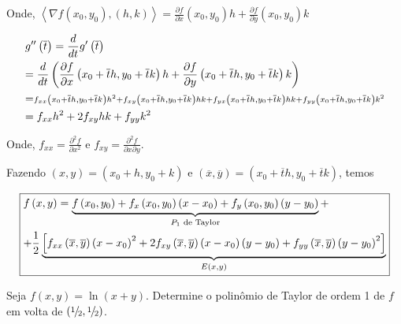 \documentclass[11pt, oneside, a4paper]{gsm-l}
\begin{document}
Onde, $\left\langle {\nabla f\left( {x_0 ,y_0 } \right),\left( {h,k} \right)} \right\rangle  = \frac{{\partial f}}
{{\partial x}}\left( {x_0 ,y_0 } \right)h + \frac{{\partial f}}
{{\partial y}}\left( {x_0 ,y_0 } \right)k$

\[
\begin{gathered}
g''\left( {\overline t } \right) = \frac{d}
{{dt}}g'\left( {\overline t } \right) \hfill \\
= \frac{d}
{{dt}}\left( {\frac{{\partial f}}
{{\partial x}}\left( {x_0  + \overline t h,y_0  + \overline t k} \right)h + \frac{{\partial f}}
{{\partial y}}\left( {x_0  + \overline t h,y_0  + \overline t k} \right)k} \right) \hfill \\
   = \scriptstyle{f_{xx} \left( {x_0  + \overline t h,y_0  + \overline t k} \right)h^2  + f_{xy} \left( {x_0  + \overline t h,y_0  + \overline t k} \right)hk + f_{yx} \left( {x_0  + \overline t h,y_0  + \overline t k} \right)hk + f_{yy} \left( {x_0  + \overline t h,y_0  + \overline t k} \right)k^2}  \hfill \\
= f_{xx} h^2  + 2f_{xy} hk + f_{yy} k^2  \hfill \\
\end{gathered}
\]

Onde, $f_{xx}  = \frac{{\partial ^2 f}}{{\partial x^2 }}$ e $f_{xy}  = \frac{{\partial ^2 f}}{{\partial x\partial y}}$.

Fazendo $\left( {x,y} \right) = \left( {x_0  + h,y_0  + k} \right)$ e $\left( {\overline x ,\overline y } \right) = \left( {x_0  + \overline t h,y_0  + \overline t k} \right)$, temos

\[\boxed{
\begin{gathered}
  f\left( {x,y} \right) = \underbrace {f\left( {x_0 ,y_0 } \right) + f_x \left( {x_0 ,y_0 } \right)\left( {x - x_0 } \right) + f_y \left( {x_0 ,y_0 } \right)\left( {y - y_0 } \right)}_{P_1 {\text{ de Taylor}}} +  \hfill \\
+ \frac{1}
{2}\underbrace {\left[ {f_{xx} \left( {\overline x ,\overline y } \right)\left( {x - x_0 } \right)^2  + 2f_{xy} \left( {\overline x ,\overline y } \right)\left( {x - x_0 } \right)\left( {y - y_0 } \right) + f_{yy} \left( {\overline x ,\overline y } \right)\left( {y - y_0 } \right)^2 } \right]}_{E\left( {x,y} \right)} \hfill \\
\end{gathered}
}\]

\begin{exem}
    Seja $f\left( {x,y} \right) = \ln \left( {x + y} \right)$. Determine o polin\^omio de Taylor de ordem 1 de $f$ em volta de $\left( {{\raise0.5ex\hbox{$\scriptstyle 1$}
\kern-0.1em/\kern-0.15em
\lower0.25ex\hbox{$\scriptstyle 2$}},{\raise0.5ex\hbox{$\scriptstyle 1$}
\kern-0.1em/\kern-0.15em
\lower0.25ex\hbox{$\scriptstyle 2$}}} \right)$.
\end{exem}
\end{document}

